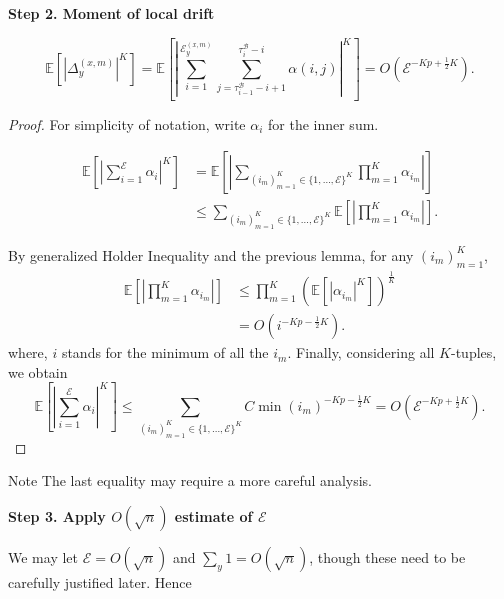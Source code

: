 \textbf{Step 2. Moment of local drift}

\begin{lemma}
	\[
		\mathbb{E}\left[ \left| \Delta_y^{(x,m)}\right|^K  \right] =  
		\mathbb{E}\left[ \left| 
		\sum_{i = 1}^{\mathcal{E}_y^{(x,m)}} 
			\sum_{j = \tau_{i-1}^{\mathcal{B}}-i+1}^{\tau_i^{\mathcal{B}}-i}   
			\alpha(i, j) 
	\right| ^K \right] 
		= O\left(\mathcal{E}^{-Kp + \frac{1}{2}K}\right)
	.\]
	\label{lem:local-drift-moment}
\end{lemma}
\begin{proof}
	For simplicity of notation, write $\alpha_i$ for the inner sum.     

	\begin{align*}
		\mathbb{E}\left[ \left| \sum_{i = 1}^{\mathcal{E}} \alpha_i \right| ^K \right] 
		&= \mathbb{E}\left[ 
			\left|
			\sum_{\left( i_m \right)_{m = 1}^K \in \{1, \ldots, \mathcal{E}\}^K} 
			\prod_{m = 1}^{K} \alpha_{i_m} 
		\right|
		\right] \\
		&\le  
		\sum_{\left( i_m \right)_{m = 1}^K \in \{1, \ldots, \mathcal{E}\}^K} 
		\mathbb{E}\left[ \left| \prod_{m = 1}^{K} \alpha_{i_m} \right| \right]
	.\end{align*}

	By generalized Holder Inequality and the previous lemma, for any $\left( i_m \right) _{m = 1}^K$,
	\begin{align*}
		\mathbb{E}\left[ \left| \prod_{m = 1}^{K} \alpha_{i_m} \right| \right]
		&\le \prod_{m = 1}^{K} \left(
			\mathbb{E}\left[
			|\alpha_{i_m}|^K
		\right] \right)^{\frac{1}{K}}  \\
		&= O(i^{-Kp - \frac{1}{2}K}) 
	.\end{align*}
	where, $i$ stands for the minimum of all the $i_m$.
	Finally, considering all $K$-tuples, we obtain
\[
		\mathbb{E}\left[ \left| \sum_{i = 1}^{\mathcal{E}} \alpha_i \right| ^K \right] 
		\le 
		\sum_{\left( i_m \right)_{m = 1}^K \in \{1, \ldots, \mathcal{E}\}^K}  
		C \min(i_m)^{- K p - \frac{1}{2} K}
		= O\left(\mathcal{E}^{-Kp + \frac{1}{2}K}\right)
.\] 
\end{proof}
\begin{note}{Note}
	The last equality may require a more careful analysis.
\end{note}




\textbf{Step 3. Apply $O(\sqrt{n}) $ estimate of $\mathcal{E}$}

We may let $\mathcal{E} = O(\sqrt{n}) $ and $\sum_y 1  = O(\sqrt{n} )$, though these need to be carefully justified later. Hence 


